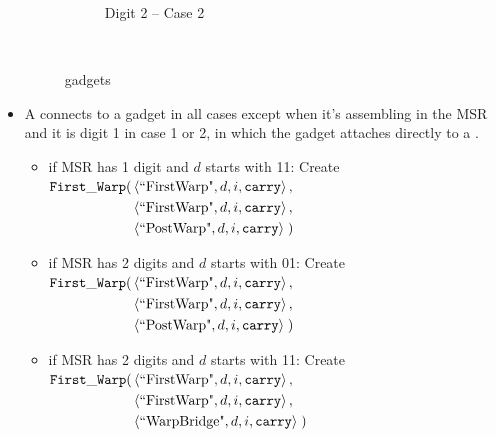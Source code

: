 \begin{itemize}
\begin{figure}[H]
\begin{subfigure}[t]{0.2\textwidth}
                    \caption{\label{fig:warping/pre_warp_case2_digit2_msr} Digit 2 -- Case 2}
                \end{subfigure}%
                ~
                \caption{\label{fig:pre_warp_gadgets} {\prewarp} gadgets }
            \end{figure}


            \item A {\firstwarp} connects to a {\warpbridge} gadget in all cases except when it's assembling
                  in the MSR and it is digit 1 in case 1 or 2, in which the {\firstwarp} gadget attaches directly
                  to a {\postwarp}.

            \begin{itemize}
                \item if MSR has 1 digit and $d$ starts with 11: Create
                $\begin{aligned}[t]
                    {\tt First\_Warp}(& \left\langle \text{``FirstWarp"}, d, i, {\tt carry} \right\rangle, \\
                               & \left\langle \text{``FirstWarp"}, d, i, {\tt carry} \right\rangle, \\
                               & \left\langle \text{``PostWarp"}, d, i, {\tt carry} \right\rangle \;)
                \end{aligned}$
                \vspace{.5cm}


                \item if MSR has 2 digits and $d$ starts with 01: Create
                $\begin{aligned}[t]
                    {\tt First\_Warp}(& \left\langle \text{``FirstWarp"}, d, i, {\tt carry} \right\rangle, \\
                    & \left\langle \text{``FirstWarp"}, d, i, {\tt carry} \right\rangle, \\
                    & \left\langle \text{``PostWarp"}, d, i, {\tt carry} \right\rangle \;)
                \end{aligned}$
                \vspace{.5cm}


                \item if MSR has 2 digits and $d$ starts with 11: Create
                $\begin{aligned}[t]
                    {\tt First\_Warp}(& \left\langle \text{``FirstWarp"}, d, i, {\tt carry} \right\rangle, \\
                    & \left\langle \text{``FirstWarp"}, d, i, {\tt carry} \right\rangle, \\
                    & \left\langle \text{``WarpBridge"}, d, i, {\tt carry} \right\rangle \;)
                \end{aligned}$
                \vspace{.5cm}


\end{itemize}
\end{itemize}
